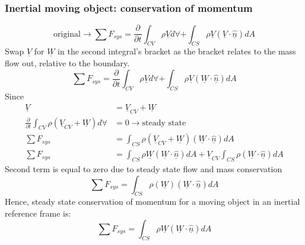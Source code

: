 \subsubsection{Inertial moving object: conservation of momentum}
\begin{equation}
  \textrm{original} \rightarrow \sum F_{sys} = \frac{\partial}{\partial t} \int_{CV} \rho \underline{V} d \forall + \int_{CS} \rho \underline{V} (\underline{V}\cdot \underline{\hat{n}}) dA
\end{equation}
Swap $\underline{V}$ for $\underline{W}$ in the second integral's bracket as the bracket relates to the mass flow out, relative to the boundary.
\begin{equation}
  \sum F_{sys} = \frac{\partial}{\partial t} \int_{CV} \rho \underline{V} d \forall + \int_{CS} \rho \underline{V} (\underline{W}\cdot \underline{\hat{n}}) dA
\end{equation}
Since
\begin{align}
  \underline{V}                                                                             & = \underline{V}_{CV} + \underline{W}                                                                                                                      \\
  \frac{\partial}{\partial t} \int_{CV} \rho (\underline{V}_{CV} + \underline{W}) d \forall & = 0 \rightarrow \textrm{steady state}                                                                                                                     \\
  \sum F_{sys}                                                                              & = \int_{CS} \rho (\underline{V}_{CV} + \underline{W}) (\underline{W}\cdot \underline{\hat{n}}) dA                                                         \\
  \sum F_{sys}                                                                              & = \int_{CS} \rho \underline{W}(\underline{W}\cdot \underline{\hat{n}}) dA + \underline{V}_{CV} \int_{CS} \rho (\underline{W}\cdot \underline{\hat{n}}) dA
\end{align}
Second term is equal to zero due to steady state flow and mass conservation
\begin{equation}
  \sum F_{sys} = \int_{CS} \rho (\underline{W})(\underline{W}\cdot \underline{\hat{n}}) dA
\end{equation}
Hence, steady state conservation of momentum for a moving object in an inertial reference frame is:
\begin{equation}
  \sum F_{sys} = \int_{CS} \rho \underline{W} (\underline{W}\cdot \underline{\hat{n}}) dA
\end{equation}
